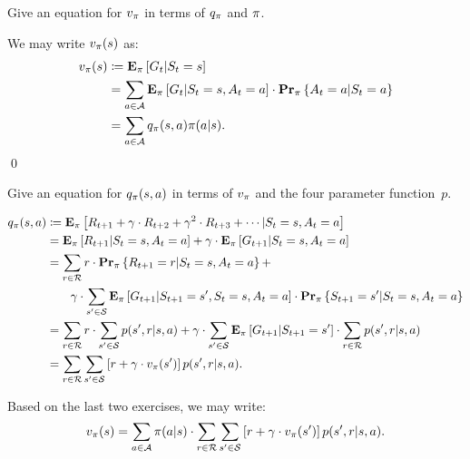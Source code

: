 \begin{exer}
Give an equation for $v_{\pi}$ in terms of $q_{\pi}$ and $\pi$.
\end{exer}
\begin{solution}
We may write $v_{\pi}(s)$ as:
\begin{align*}
    v_{\pi}(s) & \coloneqq \mathbf{E}_{\pi} \left [ G_t \vert S_t = s \right ] \\
                   & = \sum_{a \in \mathcal{A}} \mathbf{E}_{\pi} \left [ G_t \vert S_t = s, A_t = a \right ] 
                        \cdot \mathbf{Pr}_{\pi} \left \{ A_t = a \vert S_t = a \right \} \\
                   & = \sum_{a \in \mathcal{A}} q_{\pi}(s, a) \pi (a \vert s).
\end{align*}
\qed
\end{solution}

\begin{exer}
Give an equation for $q_{\pi} (s, a)$ in terms of $v_{\pi}$ and the 
four parameter function~$p$. 
\end{exer}
\begin{solution}
\begin{align*}
    q_{\pi}(s, a) & \coloneqq \mathbf{E}_{\pi} \left [ R_{t + 1} + \gamma \cdot R_{t + 2} + \gamma^2 \cdot R_{t + 3} + \cdots \vert S_t = s, A_t = a \right ] \\
                  & = \mathbf{E}_{\pi} \left [ R_{t + 1} \vert S_t = s, A_t = a \right ] + 
                    \gamma \cdot \mathbf{E}_{\pi} \left [ G_{t + 1} \vert S_t = s, A_t = a \right ] \\
                  & = \sum_{r \in \mathcal{R}} r \cdot \mathbf{Pr}_{\pi} \left \{ R_{t + 1} = r \vert S_t = s, A_t = a \right \} + \\
                  & \quad \quad \gamma \cdot \sum_{s' \in \mathcal{S}} \mathbf{E}_{\pi} \left [ G_{t + 1} \vert S_{t + 1} = s', S_t = s, A_t = a \right ]
                        \cdot \mathbf{Pr}_{\pi} \left \{ S_{t + 1} = s' \vert S_t = s, A_t = a \right \} \\ 
                  & = \sum_{r \in \mathcal{R}} r \cdot \sum_{s' \in \mathcal{S}} p(s', r \vert s, a) + 
                    \gamma \cdot \sum_{s' \in \mathcal{S}} \mathbf{E}_{\pi} \left [ G_{t + 1} \vert S_{t + 1} = s' \right ] 
                        \cdot \sum_{r \in \mathcal{R}} p(s', r \vert s, a) \\
                  & = \sum_{r \in \mathcal{R}} \sum_{s' \in \mathcal{S}} \left [ r + \gamma \cdot v_{\pi}(s') \right ] p(s', r \vert s, a).
\end{align*}
\end{solution}

Based on the last two exercises, we may write:
\begin{equation}
    v_{\pi} (s) = \sum_{a \in \mathcal{A}} \pi (a \vert s) \cdot 
            \sum_{r \in \mathcal{R}} \sum_{s' \in \mathcal{S}} \left [ r + \gamma \cdot v_{\pi}(s') \right ] p(s', r \vert s, a).
\end{equation}

